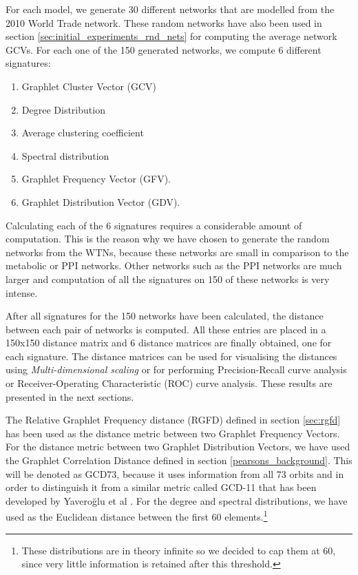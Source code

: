 For each model, we generate 30 different networks that are modelled from the 2010 World Trade network. These random networks have also been used in section \ref{sec:initial_experiments_rnd_nets} for computing the average network GCVs. For each one of the 150 generated networks, we compute 6 different signatures:
\begin{enumerate}
 \item Graphlet Cluster Vector (GCV)
 \item Degree Distribution
 \item Average clustering coefficient
 \item Spectral distribution
 \item Graphlet Frequency Vector (GFV).
 \item Graphlet Distribution Vector (GDV).  
\end{enumerate}

Calculating each of the 6 signatures requires a considerable amount of computation. This is the reason why we have chosen to generate the random networks from the WTNs, because these networks are small in comparison to the metabolic or PPI networks. Other networks such as the PPI networks are much larger and computation of all the signatures on 150 of these networks is very intense. 

After all signatures for the 150 networks have been calculated, the distance between each pair of networks is computed. All these entries are placed in a 150x150 distance matrix and 6 distance matrices are finally obtained, one for each signature. The distance matrices can be used for visualising the distances using \emph{Multi-dimensional scaling} or for performing Precision-Recall curve analysis or Receiver-Operating Characteristic (ROC) curve analysis. These results are presented in the next sections. 

The Relative Graphlet Frequency distance (RGFD) defined in section \ref{sec:rgfd} has been used as the distance metric between two Graphlet Frequency Vectors. For the distance metric between two Graphlet Distribution Vectors, we have used the Graphlet Correlation Distance defined in section \ref{pearsons_background}. This will be denoted as GCD73, because it uses information from all 73 orbits and in order to distinguish it from a similar metric called GCD-11 that has been developed by Yavero\u{g}lu et al \cite{yaverouglu2014revealing}. For the degree and spectral distributions, we have used as the Euclidean distance between the first 60 elements.\footnote{These distributions are in theory infinite so we decided to cap them at 60, since very little information is retained after this threshold.}

